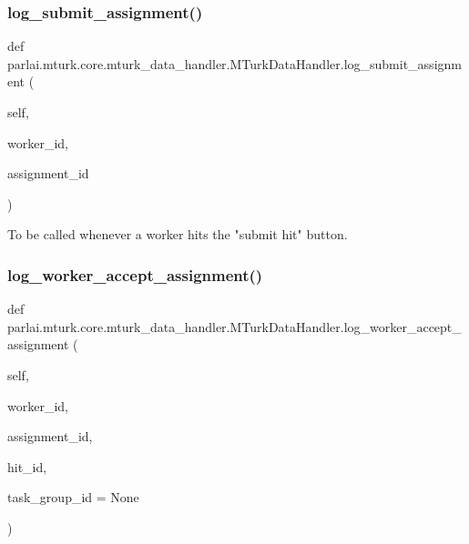 \subsubsection{\texorpdfstring{log\+\_\+submit\+\_\+assignment()}{log\_submit\_assignment()}}
{\footnotesize\ttfamily def parlai.\+mturk.\+core.\+mturk\+\_\+data\+\_\+handler.\+M\+Turk\+Data\+Handler.\+log\+\_\+submit\+\_\+assignment (\begin{DoxyParamCaption}\item[{}]{self,  }\item[{}]{worker\+\_\+id,  }\item[{}]{assignment\+\_\+id }\end{DoxyParamCaption})}

\begin{DoxyVerb}To be called whenever a worker hits the "submit hit" button.
\end{DoxyVerb}
 \mbox{\label{classparlai_1_1mturk_1_1core_1_1mturk__data__handler_1_1MTurkDataHandler_a080c2ffbf861cfe6175491a7a0bdd0ce}} 
\subsubsection{\texorpdfstring{log\+\_\+worker\+\_\+accept\+\_\+assignment()}{log\_worker\_accept\_assignment()}}
{\footnotesize\ttfamily def parlai.\+mturk.\+core.\+mturk\+\_\+data\+\_\+handler.\+M\+Turk\+Data\+Handler.\+log\+\_\+worker\+\_\+accept\+\_\+assignment (\begin{DoxyParamCaption}\item[{}]{self,  }\item[{}]{worker\+\_\+id,  }\item[{}]{assignment\+\_\+id,  }\item[{}]{hit\+\_\+id,  }\item[{}]{task\+\_\+group\+\_\+id = {\ttfamily None} }\end{DoxyParamCaption})}

